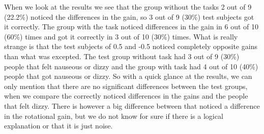 When we look at the results we see that the group without the tasks 2 out of 9 (22.2\%) noticed the differences in the gain, so 3 out of 9 (30\%)  test subjects got it correctly.  
The group with the task noticed differences in the gain in 6 out of 10 (60\%) times and got it correctly in 3 out of 10 (30\%) times. 
What is really strange is that the test subjects of 0.5 and -0.5 noticed completely opposite gains than what was excepted. 
The test group without task had 3 out of 9 (30\%) people that felt nauseous or dizzy and the group with task had 4 out of 10 (40\%) people that got nauseous or dizzy. 
So with a quick glance at the results, we can only mention that there are no significant differences between the test groups, when we compare the correctly noticed differences in the gains and the people that felt dizzy. 
There is however a big difference between that noticed a difference in the rotational gain, but we do not know for sure if there is a logical explanation or that it is just noise.

